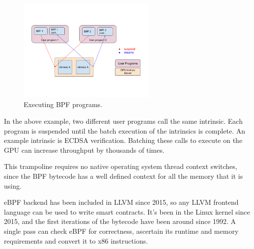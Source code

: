 \documentclass[12pt]{ltjsarticle}
\begin{document}
\begin{figure}
  \begin{center}
    \centering
    \includegraphics[width=0.6\textwidth]{../../figures/fig_11.png}
    \caption[Fig 11]{Executing  BPF programs.\label{fig_11}}
  \end{center}
  \end{figure}

In the above example, two different user programs call the same intrinsic. Each program is suspended until the batch execution of the intrinsics is complete. An example intrinsic is ECDSA verification. Batching these calls to execute on the GPU can increase throughput by thousands of times.

This trampoline requires no native operating system thread context switches, since the BPF bytecode has a well defined context for all the memory that it is using.

eBPF backend has been included in LLVM since 2015, so any LLVM frontend language can be used to write smart contracts. It’s been in the Linux kernel since 2015, and the first iterations of the bytecode have been around since 1992. A single pass can check eBPF for correctness, ascertain its runtime and memory requirements and convert it to x86 instructions.



\end{document}
